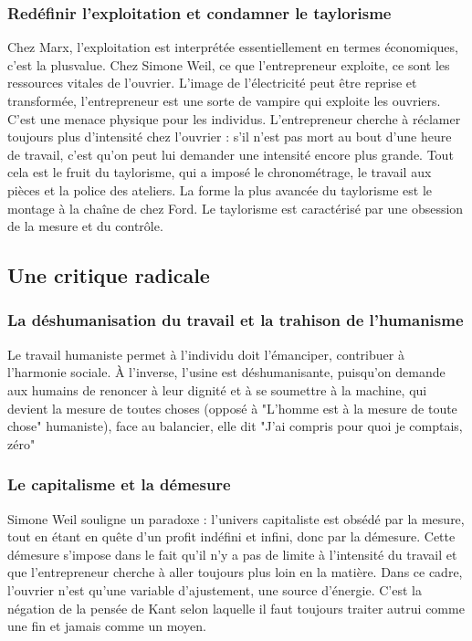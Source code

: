 \documentclass[a4paper,12pt]{book}
\begin{document}
\subsubsection{Redéfinir l'exploitation et condamner le taylorisme}
Chez Marx, l'exploitation est interprétée essentiellement en termes économiques, c'est la plusvalue. Chez Simone Weil, ce que l'entrepreneur exploite, ce sont les ressources vitales de l'ouvrier. L'image de l'électricité peut être reprise et transformée, l'entrepreneur est une sorte de vampire qui exploite les ouvriers. C'est une menace physique pour les individus. L'entrepreneur cherche à réclamer toujours plus d'intensité chez l'ouvrier : s'il n'est pas mort au bout d'une heure de travail, c'est qu'on peut lui demander une intensité encore plus grande. Tout cela est le fruit du taylorisme, qui a imposé le chronométrage, le travail aux pièces et la police des ateliers. La forme la plus avancée du taylorisme est le montage à la chaîne de chez Ford. Le taylorisme est caractérisé par une obsession de la mesure et du contrôle.

\subsection{Une critique radicale}
\subsubsection{La déshumanisation du travail et la trahison de l'humanisme}
Le travail humaniste permet à l'individu doit l'émanciper, contribuer à l'harmonie sociale. À l'inverse, l'usine est déshumanisante, puisqu'on demande aux humains de renoncer à leur dignité et à se soumettre à la machine, qui devient la mesure de toutes choses (opposé à "L'homme est à la mesure de toute chose" humaniste), face au balancier, elle dit "J'ai compris pour quoi je comptais, zéro"

\subsubsection{Le capitalisme et la démesure}
Simone Weil souligne un paradoxe : l'univers capitaliste est obsédé par la mesure, tout en étant en quête d'un profit indéfini et infini, donc par la démesure. Cette démesure s'impose dans le fait qu'il n'y a pas de limite à l'intensité du travail et que l'entrepreneur cherche à aller toujours plus loin en la matière. Dans ce cadre, l'ouvrier n'est qu'une variable d'ajustement, une source d'énergie. C'est la négation de la pensée de Kant selon laquelle il faut toujours traiter autrui comme une fin et jamais comme un moyen.
\end{document}

